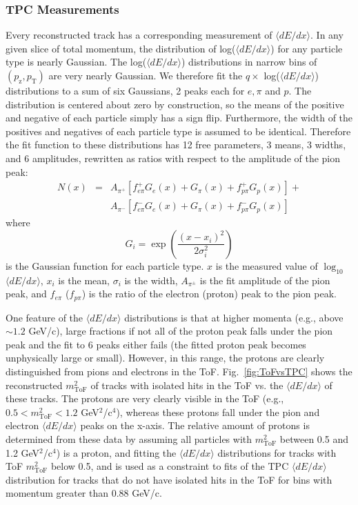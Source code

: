 \documentclass[%
aps, prd, reprint, show pacs, preprint numbers, ams math, amssymb, superscriptaddress, linenumbers]{revtex4-1}
\newcommand{\dedx}{\ensuremath{\langle dE/dx\rangle}\xspace}
\def\pzpt{$(p_\mathrm{z},p_\mathrm{T})$\xspace}
\begin{document}
\subsubsection{TPC Measurements}
Every reconstructed track has a corresponding measurement of \dedx.  In any given slice of total momentum, the 
distribution of log(\dedx) for any particle type is nearly Gaussian.  The log(\dedx) distributions in narrow bins of \pzpt are 
very nearly Gaussian.  We therefore fit the $q \times$ log(\dedx) distributions to a sum of six Gaussians, 2 peaks 
each for $e, \pi$ and $p$.  The distribution is centered about zero by construction, so the 
means of the positive and negative of each particle simply has a sign flip.  Furthermore, the width of the positives 
and negatives of each particle type is assumed to be identical.  Therefore the fit function to these distributions 
has 12 free parameters, 3 means, 3 widths, and 6 amplitudes, rewritten as ratios with respect to the amplitude of the pion peak:
\begin{eqnarray}
N(x) &  =  & A_{\pi^+}\left[f^{+}_{e\pi}G_e(x) + G_\pi(x) + f^+_{p\pi}G_p(x)\right]  + \nonumber \\
& & A_{\pi^-}\left[f^{-}_{e\pi}G_e(x) + G_\pi(x) + f^-_{p\pi}G_p(x)\right]  
\end{eqnarray}
where 
\begin{equation}
G_i = \exp\left(\frac{(x-x_i)^2}{2\sigma_i^2}\right)
\end{equation}
is the Gaussian function for each particle type.  $x$ is the measured value of $\log_{10}$\dedx, $x_i$ is the 
mean, $\sigma_i$ is the width, $A_{\pi^\pm}$ is the fit amplitude of the pion peak, and $f_{e\pi}$ ($f_{p\pi}$) is the 
ratio of the electron (proton) peak to the pion peak.

One feature of the \dedx distributions is that at higher momenta (e.g., above $\sim 1.2$ GeV/c), large fractions if not all of the proton peak falls under the pion peak and the fit to 6 peaks either fails (the fitted proton peak becomes unphysically large or small).  However, in this range, the protons are clearly distinguished from pions and electrons in the ToF.  Fig.~\ref{fig:ToFvsTPC} shows the reconstructed $m_\mathrm{ToF}^2$ of tracks with isolated hits in the ToF vs. the \dedx of these tracks.  The protons are very clearly visible in the ToF (e.g., $0.5 < m_\mathrm{ToF}^2 < 1.2$ GeV${^2}$/c$^{4}$), whereas these protons fall under the pion and electron \dedx peaks on the x-axis.  The relative amount of protons is determined from these data by assuming all particles with 
$m_\mathrm{ToF}^2$ between 0.5 and 1.2 GeV${^2}$/c$^{4}$) is a proton, and fitting the \dedx distributions for tracks with ToF $m_\mathrm{ToF}^2$ below 0.5, and is used as a constraint to fits of the TPC \dedx distribution for tracks that do not have isolated hits in the ToF for bins with momentum greater than 0.88 GeV/c.
\end{document}
